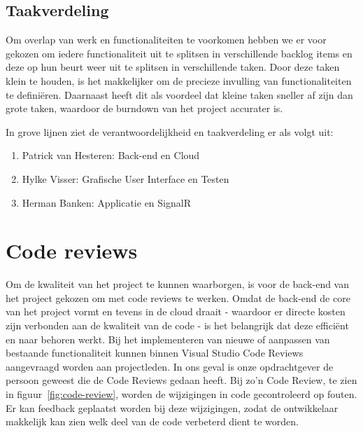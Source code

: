 \subsection{Taakverdeling}
Om overlap van werk en functionaliteiten te voorkomen hebben we er voor gekozen om iedere functionaliteit uit te splitsen in verschillende backlog items en deze op hun beurt weer uit te splitsen in verschillende taken. Door deze taken klein te houden, is het makkelijker om de precieze invulling van functionaliteiten te definiëren. Daarnaast heeft dit als voordeel dat kleine taken sneller af zijn dan grote taken, waardoor de burndown van het project accurater is.

In grove lijnen ziet de verantwoordelijkheid en taakverdeling er als volgt uit:
\begin{enumerate}
\item Patrick van Hesteren: Back-end en Cloud
\item Hylke Visser: Grafische User Interface en Testen
\item Herman Banken: Applicatie en SignalR
\end{enumerate}

\section{Code reviews}
Om de kwaliteit van het project te kunnen waarborgen, is voor de back-end van het project gekozen om met code reviews te werken. Omdat de back-end de core van het project vormt en tevens in de cloud draait - waardoor er directe kosten zijn verbonden aan de kwaliteit van de code - is het belangrijk dat deze efficiënt en naar behoren werkt. Bij het implementeren van nieuwe of aanpassen van bestaande functionaliteit kunnen binnen Visual Studio Code Reviews aangevraagd worden aan projectleden. In ons geval is onze opdrachtgever de persoon geweest die de Code Reviews gedaan heeft. Bij zo'n Code Review, te zien in figuur~\ref{fig:code-review}, worden de wijzigingen in code gecontroleerd op fouten. Er kan feedback geplaatst worden bij deze wijzigingen, zodat de ontwikkelaar makkelijk kan zien welk deel van de code verbeterd dient te worden.

